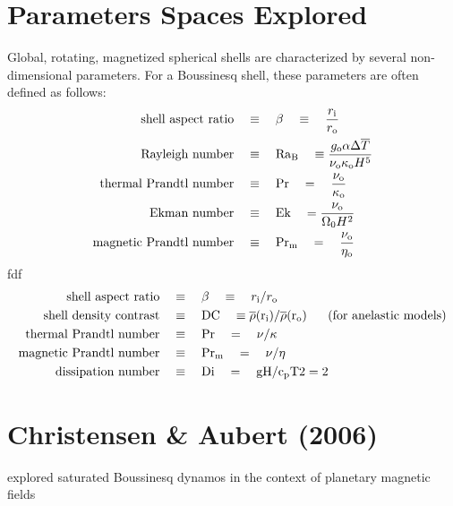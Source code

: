 \documentclass[12pt]{article} %
\begin{document}
\section{Parameters  Spaces Explored}
Global, rotating, magnetized spherical shells are characterized by several non-dimensional parameters. For a Boussinesq shell, these parameters are often defined as follows: 
\begin{align}
	\text{shell aspect ratio}\quad & \equiv\quad \beta \quad  \equiv\quad  \frac{r_{\rm{i}}}{r_{\rm{o}}}\\
	\text{Rayleigh number} \quad & \equiv \quad {\rm{Ra_B}} \quad \equiv \frac{g_{\rm{o}}\alpha\Delta\overline{T}}{\nu_{\rm{o}}\kappa_{\rm{o}} H^5}\\
	\text{thermal Prandtl number} \quad & \equiv \quad {\rm{Pr}} \quad = \quad \frac{\nu_{\rm{o}}}{\kappa_{\rm{o}}}\\
	\text{Ekman number}\quad & \equiv \quad {\rm{Ek}} \quad = \frac{\nu_{\rm{o}}}{\Omega_0H^2}\\
	\text{magnetic Prandtl number} \quad & \equiv \quad {\rm{Pr_m}} \quad = \quad \frac{\nu_{\rm{o}}}{\eta_{\rm{o}}}
\end{align}
fdf
\begin{align}
	\text{shell aspect ratio}\quad & \equiv\quad \beta \quad  \equiv\quad  r_{\rm{i}}/r_{\rm{o}}\\
	\text{shell density contrast}\quad & \equiv \quad \rm{DC} \quad \equiv \overline{\rho}(r_{\rm{i}})/\overline{\rho}(r_{\rm{o}})\ \ \ \ \  \text{(for anelastic models)}\\ 
	\text{thermal Prandtl number} \quad & \equiv \quad \rm{Pr} \quad = \quad \nu/\kappa\\
	\text{magnetic Prandtl number} \quad & \equiv \quad \rm{Pr_m} \quad = \quad \nu/\eta \\
	\text{dissipation number} \quad & \equiv\quad \rm{Di}\quad = \quad gH/c_{\rm{p}} T
	2=2
\end{align}
\section{Christensen \& Aubert (2006)}
\citet{Christensen2006} explored saturated Boussinesq dynamos in the context of planetary magnetic fields 

	

\end{document}
